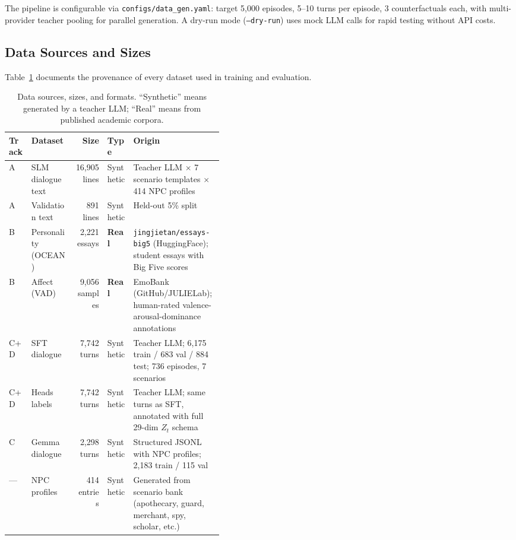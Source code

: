 \documentclass[11pt]{article}
\begin{document}
The pipeline is configurable via \texttt{configs/data\_gen.yaml}: target 5,000 episodes, 5--10 turns per episode, 3 counterfactuals each, with multi-provider teacher pooling for parallel generation.
A dry-run mode (\texttt{--dry-run}) uses mock LLM calls for rapid testing without API costs.

\subsection{Data Sources and Sizes}

Table~\ref{tab:datasources} documents the provenance of every dataset used in training and evaluation.

\begin{table}[tp]
\centering
\caption{Data sources, sizes, and formats. ``Synthetic'' means generated by a teacher LLM; ``Real'' means from published academic corpora.}
\label{tab:datasources}
\footnotesize\setlength{\tabcolsep}{3pt}
\begin{tabular}{@{}llrlp{0.42\linewidth}@{}}
\toprule
\textbf{Track} & \textbf{Dataset} & \textbf{Size} & \textbf{Type} & \textbf{Origin} \\
\midrule
A & SLM dialogue text & 16,905 lines & Synthetic & Teacher LLM $\times$ 7 scenario templates $\times$ 414 NPC profiles \\
A & Validation text & 891 lines & Synthetic & Held-out 5\% split \\
\midrule
B & Personality (OCEAN) & 2,221 essays & \textbf{Real} & \texttt{jingjietan/essays-big5} (HuggingFace); student essays with Big Five scores \\
B & Affect (VAD) & 9,056 samples & \textbf{Real} & EmoBank (GitHub/JULIELab); human-rated valence-arousal-dominance annotations \\
\midrule
C+D & SFT dialogue & 7,742 turns & Synthetic & Teacher LLM; 6,175 train / 683 val / 884 test; 736 episodes, 7 scenarios \\
C+D & Heads labels & 7,742 turns & Synthetic & Teacher LLM; same turns as SFT, annotated with full 29-dim $Z_t$ schema \\
C & Gemma dialogue & 2,298 turns & Synthetic & Structured JSONL with NPC profiles; 2,183 train / 115 val \\
\midrule
--- & NPC profiles & 414 entries & Synthetic & Generated from scenario bank (apothecary, guard, merchant, spy, scholar, etc.) \\
\bottomrule
\end{tabular}
\end{table}
\end{document}
